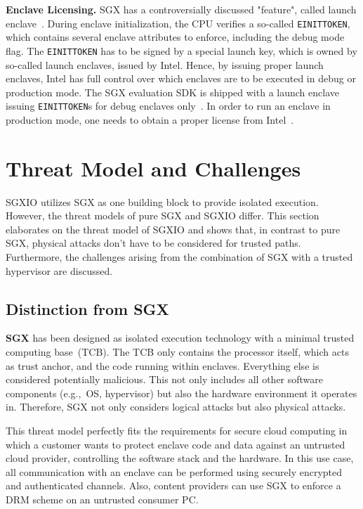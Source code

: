 \documentclass{sig-alternate-05-2015}
\begin{document}
\textbf{Enclave Licensing.}
SGX has a controversially discussed "feature", called launch enclave~\cite{beekman_intel_2015}. During enclave initialization, the CPU verifies a so-called \verb!EINITTOKEN!, which contains several enclave attributes to enforce, including the debug mode flag. The \verb!EINITTOKEN! has to be signed by a special launch key, which is owned by so-called launch enclaves, issued by Intel. Hence, by issuing proper launch enclaves, Intel has full control over which enclaves are to be executed in debug or production mode. The SGX evaluation SDK is shipped with a launch enclave issuing \verb!EINITTOKEN!s for debug enclaves only~\cite{sgxsdk}. In order to run an enclave in production mode, one needs to obtain a proper license from Intel~\cite{johnson_intel_2016}.


\section{Threat Model and Challenges}\label{sec:problem}

SGXIO utilizes SGX as one building block to provide isolated execution. 
However, the threat models of pure SGX and SGXIO differ. 
This section elaborates on the threat model of SGXIO and shows that, in contrast to pure SGX, physical attacks don't have to be considered for trusted paths. 
Furthermore, the challenges arising from the combination of SGX with a trusted hypervisor are discussed.

\subsection{Distinction from SGX}\label{sec:use_case}

\textbf{SGX} has been designed as isolated execution technology with a minimal trusted computing base~(TCB). 
The TCB only contains the processor itself, which acts as trust anchor, and the code running within enclaves. 
Everything else is considered potentially malicious. 
This not only includes all other software components (e.g.,~OS, hypervisor) but also the hardware environment it operates in. 
Therefore, SGX not only considers logical attacks but also physical attacks.

This threat model perfectly fits the requirements for secure cloud computing in which a customer wants to protect enclave code and data against an untrusted cloud provider, controlling the software stack and the hardware. 
In this use case, all communication with an enclave can be performed using securely encrypted and authenticated channels.
Also, content providers can use SGX to enforce a DRM scheme on an untrusted consumer PC.
\end{document}
